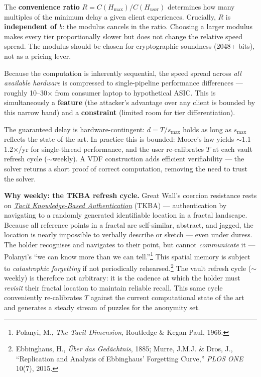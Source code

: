 \documentclass[a4paper,11pt]{article}
\begin{document}
The \textbf{convenience ratio} $R = C(H_{\max}) / C(H_{\text{user}})$ determines how many multiples of the minimum delay a given client experiences. Crucially, $R$ is \textbf{independent of $b$}: the modulus cancels in the ratio. Choosing a larger modulus makes every tier proportionally slower but does not change the relative speed spread. The modulus should be chosen for cryptographic soundness (2048+ bits), not as a pricing lever.

Because the computation is inherently sequential, the speed spread across \textit{all available hardware} is compressed to single-pipeline performance differences --- roughly 10--30$\times$ from consumer laptop to hypothetical ASIC. This is simultaneously a \textbf{feature} (the attacker's advantage over any client is bounded by this narrow band) and a \textbf{constraint} (limited room for tier differentiation).

The guaranteed delay is hardware-contingent: $d = T / s_{\max}$ holds as long as $s_{\max}$ reflects the state of the art. In practice this is bounded: Moore's law yields $\sim$1.1--1.2$\times$/yr for single-thread performance, and the user re-calibrates $T$ at each vault refresh cycle ($\sim$weekly). A VDF construction adds efficient verifiability --- the solver returns a short proof of correct computation, removing the need to trust the solver.

\medskip
\noindent\textbf{Why weekly: the TKBA refresh cycle.} Great Wall's coercion resistance rests on \href{https://en.wikipedia.org/wiki/Tacit_knowledge}{\textit{Tacit Knowledge-Based Authentication}} (TKBA) --- authentication by navigating to a randomly generated identifiable location in a fractal landscape. Because all reference points in a fractal are self-similar, abstract, and jagged, the location is nearly impossible to verbally describe or sketch --- even under duress. The holder recognises and navigates to their point, but cannot \textit{communicate} it --- Polanyi's ``we can know more than we can tell.''\footnote{Polanyi, M., \textit{The Tacit Dimension}, Routledge \& Kegan Paul, 1966.} This spatial memory is subject to \textit{catastrophic forgetting} if not periodically rehearsed.\footnote{Ebbinghaus, H., \textit{{\"U}ber das Ged{\"a}chtnis}, 1885; Murre, J.M.J. \& Dros, J., ``Replication and Analysis of Ebbinghaus' Forgetting Curve,'' \textit{PLOS ONE} 10(7), 2015.} The vault refresh cycle ($\sim$weekly) is therefore not arbitrary: it is the cadence at which the holder must \textit{revisit} their fractal location to maintain reliable recall. This same cycle conveniently re-calibrates $T$ against the current computational state of the art and generates a steady stream of puzzles for the anonymity set.
\end{document}
